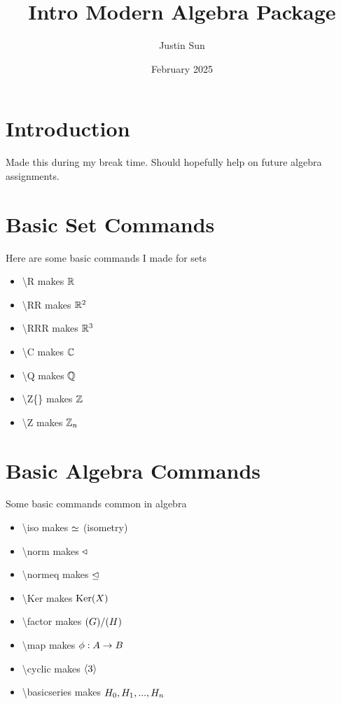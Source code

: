 \documentclass{article}
\title{Intro Modern Algebra Package}
\author{Justin Sun}
\date{February 2025}
\begin{document}
\maketitle
\section{Introduction}
Made this during my break time. Should hopefully help on future algebra assignments.
\section{Basic Set Commands}
Here are some basic commands I made for sets
\begin{itemize}
    \item \textbackslash R makes $\mathbb{R}$
    \item \textbackslash RR makes $\mathbb{R}^2$
    \item \textbackslash RRR makes $\mathbb{R}^3$
    \item \textbackslash C makes $\mathbb{C}$
    \item \textbackslash Q makes $\mathbb{Q}$
    \item \textbackslash Z\{\} makes $\mathbb{Z}_{}$
    \item \textbackslash Z makes $\mathbb{Z}_{n}$
\end{itemize}

\section{Basic Algebra Commands}
Some basic commands common in algebra
\begin{itemize}
    \item \textbackslash iso makes $\simeq$ (isometry)
    \item \textbackslash norm makes $\triangleleft$
    \item \textbackslash normeq makes $\trianglelefteq$
    \item \textbackslash Ker makes $\text{Ker}(X)$
    \item \textbackslash factor makes $(G)/(H)$
    \item \textbackslash map\curlb{$\phi$} makes $\phi: A \rightarrow B$
    \item \textbackslash cyclic makes $\langle 3 \rangle$
    \item \textbackslash basicseries makes ${H}_0, {H}_1, ..., {H}_n$
\end{itemize}
\end{document}
